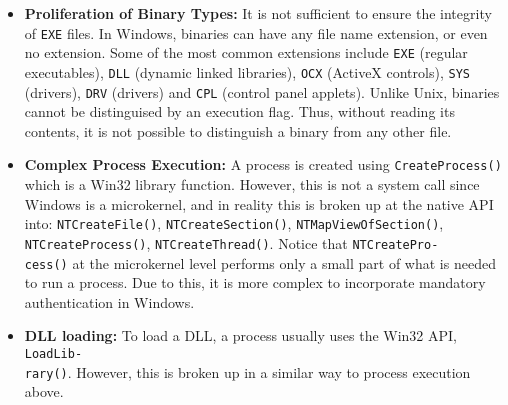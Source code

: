 \begin{itemize}
\item {\bf Proliferation of Binary Types:}
It is not sufficient to ensure the integrity of {\tt EXE} files.
In Windows, binaries can have any file name extension, or even no extension.
Some of the most common extensions include {\tt EXE} (regular
executables), {\tt DLL} (dynamic linked libraries), {\tt OCX} 
(ActiveX controls), {\tt SYS} (drivers), {\tt DRV} (drivers)
and {\tt CPL} (control panel applets).
Unlike Unix, binaries cannot be distinguised by an execution flag.
Thus, without reading its contents,
it is not possible to distinguish a binary from any other file.

\item {\bf Complex Process Execution:}
A process is created using {\tt CreateProcess()} which is a Win32 library
function. However, this is not a system call since Windows is a microkernel,
and in reality this is broken up at the native API into:
{\tt NTCreateFile()}, {\tt NTCreateSection()}, {\tt NTMapViewOfSection()},
{\tt NTCreateProcess()}, {\tt NTCreateThread()}.
Notice that {\tt NTCreatePro-\\cess()} at the microkernel level 
performs only a small part of what is needed to run a process.
Due to this, it is more complex to incorporate mandatory authentication in Windows.

\item {\bf DLL loading:}
To load a DLL, a process usually uses the Win32 API, {\tt LoadLib-\\rary()}.
However, this is broken up in a similar way to process execution above.



\end{itemize}
